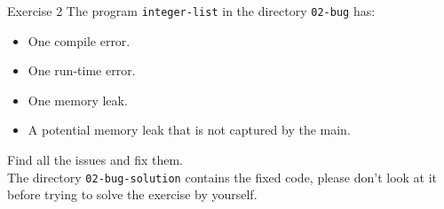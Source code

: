 \documentclass[10pt]{beamer}
\begin{document}
\begin{frame}{Exercise 2}
The program \texttt{integer-list} in the directory \texttt{02-bug} has:

\begin{itemize}
    \item One compile error.
    \item One run-time error.
    \item One memory leak.
    \item A potential memory leak that is not captured by the main.
\end{itemize}
\vfill
Find all the issues and fix them. \\[3mm]

The directory \texttt{02-bug-solution} contains the fixed code,
please don't look at it before trying to solve the exercise by yourself.
\end{frame}
\end{document}
